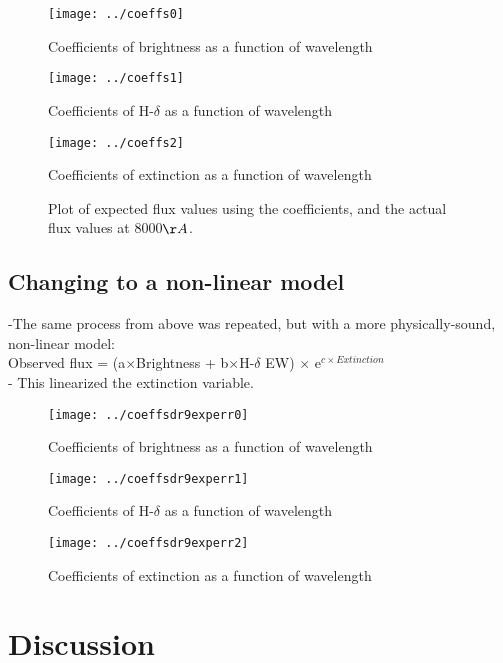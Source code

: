 \documentclass[manuscript]{aastex}
\begin{document}
\begin{figure}
\texttt{[image: ../coeffs0]}\\
\caption{Coefficients of brightness as a function of wavelength}
\end{figure}
\begin{figure}
\texttt{[image: ../coeffs1]}\\
\caption{Coefficients of H-$\delta$ as a function of wavelength}
\end{figure}
\begin{figure}
\texttt{[image: ../coeffs2]}\\
\caption{Coefficients of extinction as a function of wavelength}
\end{figure}
\begin{figure}
\caption{Plot of expected flux values using the coefficients, and the actual flux values at 8000$\AA$.}
\end{figure}

\subsection{Changing to a non-linear model}
-The same process from above was repeated, but with a more physically-sound, non-linear model:\\
Observed flux = (a$\times$Brightness + b$\times$H-$\delta$ EW) $\times$ e$^{c \times Extinction}$\\
- This linearized the extinction variable.
\begin{figure}
\texttt{[image: ../coeffsdr9experr0]}\\
\caption{Coefficients of brightness as a function of wavelength}
\end{figure}
\begin{figure}
\texttt{[image: ../coeffsdr9experr1]}\\
\caption{Coefficients of H-$\delta$ as a function of wavelength}
\end{figure}
\begin{figure}
\texttt{[image: ../coeffsdr9experr2]}\\
\caption{Coefficients of extinction as a function of wavelength}
\end{figure}

\section{Discussion}
\end{document}

